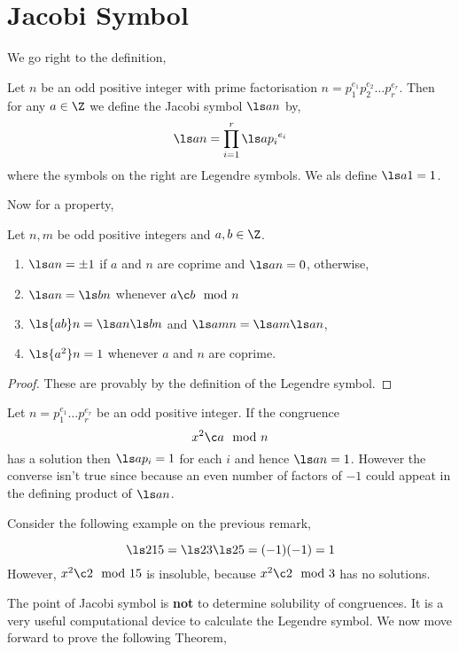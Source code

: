 \section{Jacobi Symbol}
We go right to the definition,
\begin{ndefi}
  Let $n$ be an odd positive integer with prime factorisation $n = p_1^{e_1}p_2^{e_2}\dots p_r^{e_r}$. Then for any $a \in \Z$ we define the Jacobi symbol $\ls a n$ by,
  $$ \ls a n = \prod_{i=1}^r \ls a {p_i} ^{e_i} $$
  where the symbols on the right are Legendre symbols. We als define $\ls a 1 = 1$.
\end{ndefi}
Now for a property,
\begin{nthm}[]
  Let $n, m$ be odd positive integers and $a, b \in \Z$.
  \begin{enumerate}
    \item $\ls a n = \pm 1$ if $a$ and $n$ are coprime and $\ls a n = 0$, otherwise,
    \item $\ls a n = \ls b n$ whenever $a \c b \mod n$
    \item $\ls {ab} n = \ls a n \ls b n$ and $\ls a {mn} = \ls a m\ls a n$,
    \item $\ls {a^2} n = 1$ whenever $a$ and $n$ are coprime.
  \end{enumerate}
\end{nthm}
\begin{proof}
  These are provably by the definition of the Legendre symbol.
\end{proof}

\begin{remark}
   Let $n = p_1^{e_1}\dots p_r^{e_r}$ be an odd positive integer. If the congruence
   $$ x^2 \c a \mod n  $$
   has a solution then $\ls a {p_i} = 1$ for each $i$ and hence $\ls a n = 1$. However the converse isn't true since because an even number of factors of $-1$ could appeat in the defining product of $\ls a n$.
\end{remark}
Consider the following example on the previous remark,
\begin{eg}
  $$ \ls 2 {15} = \ls 2 3\ls 2 5 = (-1)(-1) = 1 $$
  However, $x^2 \c 2 \mod 15$ is insoluble, because $x^2 \c 2\mod 3$ has no solutions.
\end{eg}
\noindent
The point of Jacobi symbol is \textbf{not} to determine solubility of congruences. It is a very useful computational device to calculate the Legendre symbol. We now move forward to prove the following Theorem,

